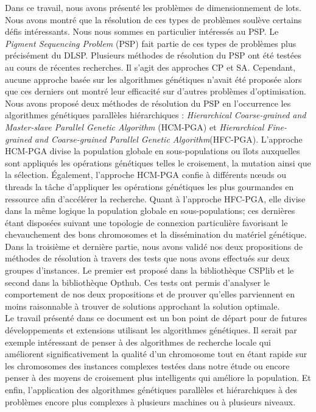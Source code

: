 
Dans ce travail, nous avons présenté	les problèmes de dimensionnement de lots. Nous avons montré que la résolution de ces types de problèmes soulève certains défis intéressants. Nous nous sommes en particulier intéressés au PSP. Le \emph{Pigment Sequencing Problem} (PSP) fait partie de ces types de problèmes plus précisément du DLSP. Plusieurs méthodes de résolution du PSP ont été testées au cours de récentes recherches. Il s'agit des approches CP et SA. Cependant, aucune approche basée sur les algorithmes génétiques n'avait été proposée alors que ces derniers ont montré leur efficacité sur d'autres problèmes d'optimisation.\\
	\hspace*{.5cm} Nous avons proposé deux méthodes de résolution du PSP en l’occurrence les algorithmes génétiques parallèles hiérarchiques : \emph{Hierarchical Coarse-grained and Master-slave Parallel Genetic Algorithm} (HCM-PGA) et \emph{Hierarchical Fine-grained and Coarse-grained Parallel Genetic Algorithm}(HFC-PGA). L'approche HCM-PGA divise la population globale en sous-populations ou îlots auxquelles sont appliqués les opérations génétiques telles le croisement, la mutation ainsi que la sélection. Également, l'approche HCM-PGA confie à différents nœuds ou threads la tâche d'appliquer les opérations génétiques les plus gourmandes en ressource afin d'accélérer la recherche. Quant à l'approche HFC-PGA, elle divise dans la même logique la population globale en sous-populations; ces dernières étant disposées suivant une topologie de connexion particulière favorisant le chevauchement des bons chromosomes et la dissémination du matériel génétique.\\
	\hspace*{.5cm} Dans la troisième et dernière partie, nous avons validé nos deux propositions de méthodes de résolution à travers des tests que nous avons effectués sur deux groupes d'instances. Le premier est proposé dans la bibliothèque CSPlib et le second dans la bibliothèque Opthub. Ces tests ont permis d'analyser le comportement de nos deux propositions et de prouver qu'elles parviennent en moins raisonnable à trouver de solutions approchant la solution optimale.\\
	\hspace*{.5cm}Le travail présenté dans ce document est un bon point de départ pour de futures développements et extensions utilisant les algorithmes génétiques. Il serait par exemple intéressant de penser à des algorithmes de recherche locale qui améliorent significativement la qualité d'un chromosome tout en étant rapide sur les chromosomes des instances complexes testées dans notre étude ou encore penser à des moyens de croisement plus intelligents qui améliore la population. Et enfin, l'application des algorithmes génétiques parallèles et hiérarchiques à des problèmes encore plus complexes à plusieurs machines ou à plusieurs niveaux. 